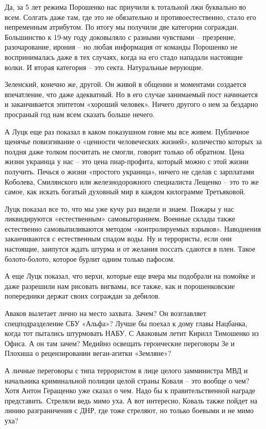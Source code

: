 Да, за 5 лет режима Порошенко нас приучили к тотальной лжи буквально во всем.
Солгать даже там, где это не обязательно и противоестественно, стало его
непременным атрибутом. По итогу мы получили две категории сограждан.
Большинство к 19-му году доковыляло с разными чувствами – презрение,
разочарование, ирония – но любая информация от команды Порошенко не
воспринималась даже в тех случаях, когда на его стадо нападали настоящие волки.
И вторая категория – это секта. Натуральные верующие.

Зеленский, конечно же, другой. Он живой в общении и моментами создается
впечатление, что даже адекватный. Но в его случае занимаемый пост начинается и
заканчивается эпитетом «хороший человек». Ничего другого о нем за бездарно
просраный год нам всем сказать больше нечего.

А Луцк еще раз показал в каком показушном говне мы все живем. Публичное щенячье
повизгивание о «ценности человеческих жизней», количество которых за полдня
даже толком посчитать не смогли, говорит только об обратном. Цена жизни
украинца у нас – это цена пиар-профита, который можно с этой жизни получить.
Печься о жизни «простого украинца», ничего не сделав с зарплатами Коболева,
Смилянского или железнодорожного специалиста Лещенко – это то же самое, как
искать богатый духовный мир в каждом килограмме Третьяковой.

Луцк показал все то, что мы уже кучу раз видели и знаем. Пожары у нас
ликвидируются «естественным» самовыгоранием. Военные склады также естественно
самовыпиливаются методом «контролируемых взрывов». Наводнения заканчиваются с
естественным спадом воды. Ну и террористы, если они настоящие, заипутся ждать
штурма и от желания поссать сдаются в плен. Такое болото-болото, которое бурлит
одним только пафосом.

А еще Луцк показал, что верхи, которые еще вчера мы подобрали на помойке и даже
разрешили нам рисовать вигвамы, все также, как и порошенковские попередники
держат своих сограждан за дебилов.

Аваков вылетает лично на место захвата. Зачем? Он возглавляет спецподразделение
СБУ «Альфа»? Лучше бы поехал к дому главы Нацбанка, когда тот пытались
штурмовать НАБУ. С Аваковым летит Кирилл Тимошенко из Офиса. А он там зачем?
Медийно освещать героические переговоры Зе и Плохиша о рецензировании
веган-агитки «Земляне»? 

А личные переговоры с типа террористом в лице целого замминистра МВД и
начальника криминальной полиции целой страны Коваля – это вообще о чем? Хотя
Антон Геращенко уже сказал о чем. Надо бы к правительственной награде
представить. Стреляли ведь мимо уха. А вот интересно, Коваль также пойдет на
линию разграничения с ДНР, где тоже стреляют, но только боевыми и не мимо уха?

